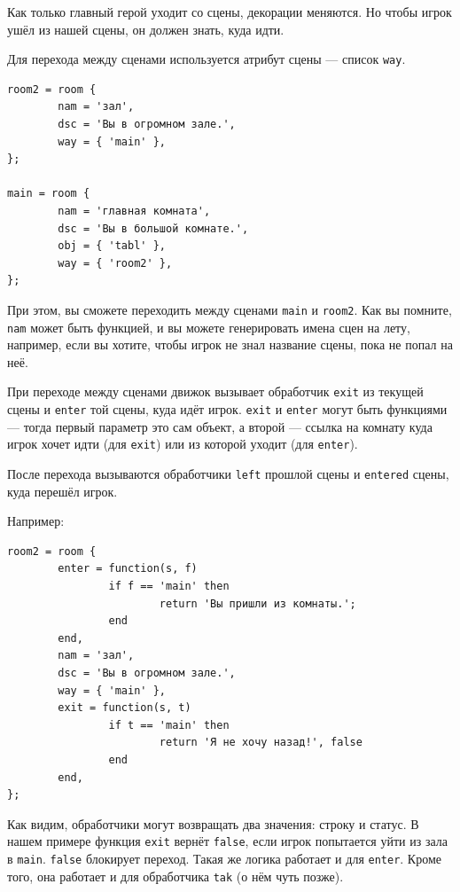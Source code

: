 \documentclass[a4paper,12pt]{article}
\begin{document}
Как только главный герой уходит со сцены, декорации меняются. Но чтобы игрок ушёл из нашей сцены, он должен знать, куда идти.

Для перехода между сценами используется атрибут сцены --- список \verb/way/.

\begin{verbatim}
room2 = room {
        nam = 'зал',
        dsc = 'Вы в огромном зале.',
        way = { 'main' },
};

main = room {
        nam = 'главная комната',
        dsc = 'Вы в большой комнате.',
        obj = { 'tabl' },
        way = { 'room2' },
};
\end{verbatim}

При этом, вы сможете переходить между сценами \verb/main/ и \verb/room2/. Как вы помните, \verb/nam/ может быть функцией, и вы можете генерировать имена сцен на лету, например, если вы хотите, чтобы игрок не знал название сцены, пока не попал на неё.

При переходе между сценами движок вызывает обработчик \verb/exit/ из текущей сцены и \verb/enter/ той сцены, куда идёт игрок. \verb/exit/ и \verb/enter/ могут быть функциями --- тогда первый параметр это сам объект, а второй --- ссылка на комнату куда игрок хочет идти (для \verb/exit/) или из которой уходит (для \verb/enter/).

После перехода вызываются обработчики \verb/left/ прошлой сцены и \verb/entered/ сцены, куда перешёл игрок.

Например:

\begin{verbatim}
room2 = room {
        enter = function(s, f)
                if f == 'main' then
                        return 'Вы пришли из комнаты.';
                end
        end,
        nam = 'зал',
        dsc = 'Вы в огромном зале.',
        way = { 'main' },
        exit = function(s, t)
                if t == 'main' then
                        return 'Я не хочу назад!', false
                end
        end,
};
\end{verbatim}

Как видим, обработчики могут возвращать два значения: строку и статус. В нашем примере функция \verb/exit/ вернёт \verb/false/, если игрок попытается уйти из зала в \verb/main/. \verb/false/ блокирует переход. Такая же логика работает и для \verb/enter/. Кроме того, она работает и для обработчика \verb/tak/ (о нём чуть позже).
\end{document}
